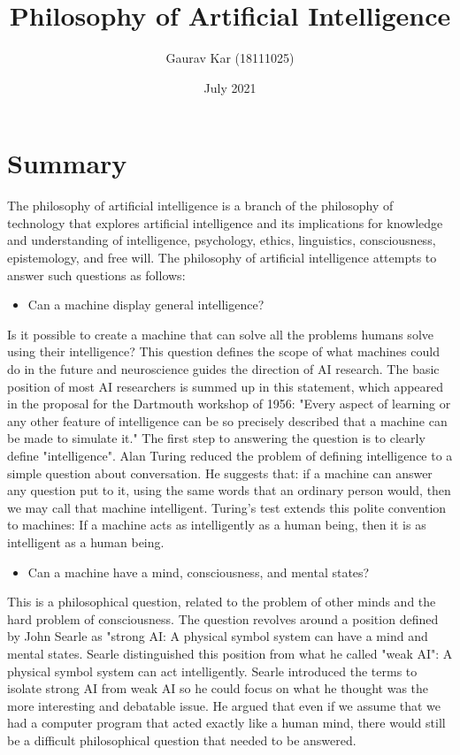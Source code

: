 \documentclass{article}
\title{Philosophy of Artificial Intelligence}
\author{Gaurav Kar (18111025)}
\date{July 2021}
\begin{document}
\maketitle

\section{Summary}
The philosophy of artificial intelligence is a branch of the philosophy of technology that explores artificial intelligence and its implications for knowledge and understanding of intelligence, psychology, ethics, linguistics, consciousness, epistemology, and free will. The philosophy of artificial intelligence attempts to answer such questions as follows:
\begin{itemize}
    \item Can a machine display general intelligence?
\end{itemize} 
Is it possible to create a machine that can solve all the problems humans solve using their intelligence? This question defines the scope of what machines could do in the future and neuroscience guides the direction of AI research. The basic position of most AI researchers is summed up in this statement, which appeared in the proposal for the Dartmouth workshop of 1956: "Every aspect of learning or any other feature of intelligence can be so precisely described that a machine can be made to simulate it."
The first step to answering the question is to clearly define "intelligence". Alan Turing reduced the problem of defining intelligence to a simple question about conversation. He suggests that: if a machine can answer any question put to it, using the same words that an ordinary person would, then we may call that machine intelligent. Turing's test extends this polite convention to machines: If a machine acts as intelligently as a human being, then it is as intelligent as a human being.
\begin{itemize}
    \item Can a machine have a mind, consciousness, and mental states?
\end{itemize}
This is a philosophical question, related to the problem of other minds and the hard problem of consciousness. The question revolves around a position defined by John Searle as "strong AI: A physical symbol system can have a mind and mental states. Searle distinguished this position from what he called "weak AI": A physical symbol system can act intelligently. Searle introduced the terms to isolate strong AI from weak AI so he could focus on what he thought was the more interesting and debatable issue. He argued that even if we assume that we had a computer program that acted exactly like a human mind, there would still be a difficult philosophical question that needed to be answered.\\
\end{document}
